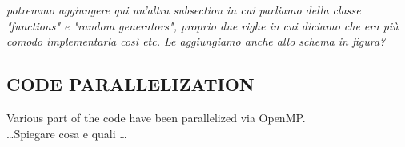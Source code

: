 \textit{potremmo aggiungere qui un'altra subsection in cui parliamo della classe "functions" e "random generators", proprio due righe in cui diciamo che era più comodo implementarla così etc. Le aggiungiamo anche allo schema in figura?}
    
\subsection{CODE PARALLELIZATION}
Various part of the code have been parallelized via OpenMP. \\
\dots Spiegare cosa e quali \dots 